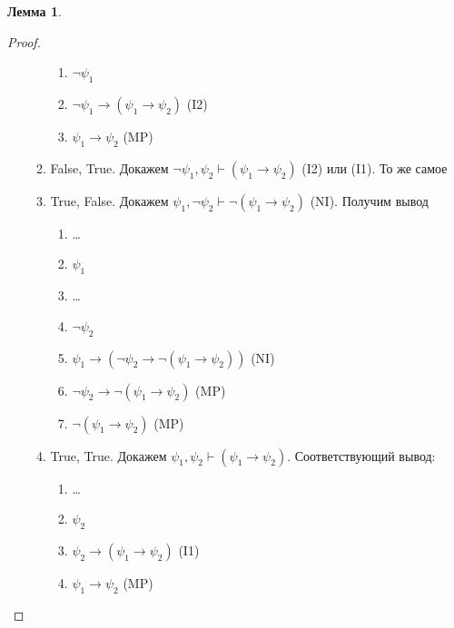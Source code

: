 \documentclass[12pt]{article}
\let\im\rightarrow
\let\n\neg
\theoremstyle{definition}
\theoremstyle{statement}
\theoremstyle{theorem}
\newtheorem{lemma}{Лемма}[section]
\begin{document}
\begin{lemma}
\begin{proof}
\begin{itemize}
\begin{enumerate}
\begin{enumerate}
              \item $\n \psi_1$

              \item $\n \psi_1 \im (\psi_1 \im \psi_2)$ (I2)

              \item $\psi_1 \im \psi_2$ (MP)
            \end{enumerate}

          \item False, True. Докажем $\n \psi_1, \psi_2 \vdash
            (\psi_1 \im \psi_2)$ (I2) или (I1). То же самое

          \item True, False. Докажем $\psi_1, \n \psi_2 \vdash \n
            (\psi_1 \im \psi_2)$ (NI). Получим вывод
            \begin{enumerate}
              \item \dots

              \item $\psi_1$

              \item \dots

              \item $\n \psi_2$

              \item $\psi_1 \im (\n \psi_2 \im \n(\psi_1 \im \psi_2))$ (NI)

              \item $\n \psi_2 \im \n (\psi_1 \im \psi_2)$ (MP)

              \item $\n (\psi_1 \im \psi_2)$ (MP)
            \end{enumerate}

          \item True, True. Докажем $\psi_1, \psi_2 \vdash (\psi_1
            \im \psi_2)$. Соответствующий вывод:
            \begin{enumerate}
              \item \dots

              \item $\psi_2$

              \item $\psi_2 \im (\psi_1 \im \psi_2)$ (I1)

              \item $\psi_1 \im \psi_2$ (MP)
            \end{enumerate}
        \end{enumerate}
    \end{itemize}
  \end{proof}
\end{lemma}
\end{document}

